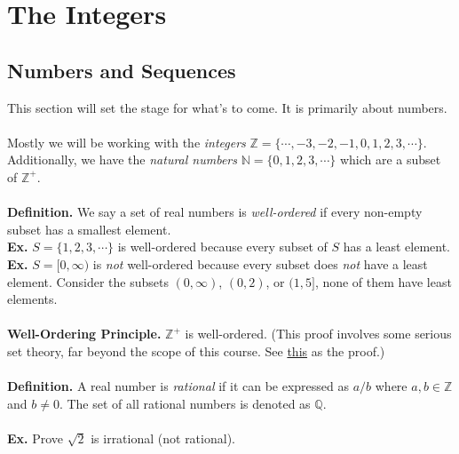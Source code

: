 \documentclass[class=article, crop=false]{standalone}
\begin{document}
    
\section{The Integers}

\subsection{Numbers and Sequences}
This section will set the stage for what's to come. It is primarily about numbers.\\\\
Mostly we will be working with the \emph{integers} $\mathbb{Z} = \{\cdots, -3,-2,-1,0,1,2,3,\cdots\}$.
Additionally, we have the \emph{natural numbers} $\mathbb{N} = \{0,1,2,3,\cdots\}$ which are a subset of $\mathbb{Z}^+$.\\\\
\textbf{Definition.} We say a set of real numbers is \emph{well-ordered} if every non-empty subset has a smallest element.\\
\textbf{Ex.} $S = \{1,2,3,\cdots\}$ is well-ordered because every subset of $S$ has a least element.\\
\textbf{Ex.} $S = [0, \infty)$ is \emph{not} well-ordered because every subset does \emph{not} have a least element. 
Consider the subsets $(0,\infty)$, $(0,2)$, or $(1,5]$, none of them have least elements.\\\\
\textbf{Well-Ordering Principle.} $\mathbb{Z}^+$ is well-ordered. (This proof involves some serious set theory,
far beyond the scope of this course. See \href{https://math.berkeley.edu/~kpmann/Well-ordering.pdf}{this} as the proof.)\\\\
\textbf{Definition.} A real number is \emph{rational} if it can be expressed as $a/b$ where $a,b\in\mathbb{Z}$ and $b\neq 0$.
The set of all rational numbers is denoted as $\mathbb{Q}$.\\\\
\textbf{Ex.} Prove $\sqrt{2}$ is irrational (not rational).
\end{document}
